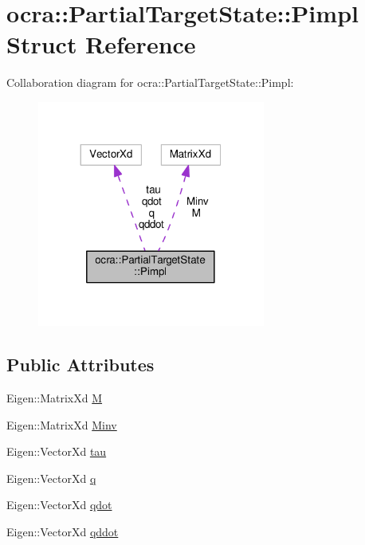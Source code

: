 \hypertarget{structocra_1_1PartialTargetState_1_1Pimpl}{}\section{ocra\+:\+:Partial\+Target\+State\+:\+:Pimpl Struct Reference}
\label{structocra_1_1PartialTargetState_1_1Pimpl}


Collaboration diagram for ocra\+:\+:Partial\+Target\+State\+:\+:Pimpl\+:
\nopagebreak
\begin{figure}[H]
\begin{center}
\leavevmode
\includegraphics[width=212pt]{dc/d0b/structocra_1_1PartialTargetState_1_1Pimpl__coll__graph}
\end{center}
\end{figure}
\subsection*{Public Attributes}
\begin{DoxyCompactItemize}
\item 
Eigen\+::\+Matrix\+Xd \hyperlink{structocra_1_1PartialTargetState_1_1Pimpl_acf8d5f65cf416eda2285044fb31e16dd}{M}
\item 
Eigen\+::\+Matrix\+Xd \hyperlink{structocra_1_1PartialTargetState_1_1Pimpl_a14905360b00dea81b81fd48960fbe7a5}{Minv}
\item 
Eigen\+::\+Vector\+Xd \hyperlink{structocra_1_1PartialTargetState_1_1Pimpl_a68194144a3fdbdb73744178332101ed0}{tau}
\item 
Eigen\+::\+Vector\+Xd \hyperlink{structocra_1_1PartialTargetState_1_1Pimpl_a0d72ffd9b45ff335dee37874459dfc8d}{q}
\item 
Eigen\+::\+Vector\+Xd \hyperlink{structocra_1_1PartialTargetState_1_1Pimpl_a788a4c8818c07f7cd401d3a7cf1cf5c4}{qdot}
\item 
Eigen\+::\+Vector\+Xd \hyperlink{structocra_1_1PartialTargetState_1_1Pimpl_ae9c10dd0f603be49ec43fdf69f8d6556}{qddot}
\end{DoxyCompactItemize}


